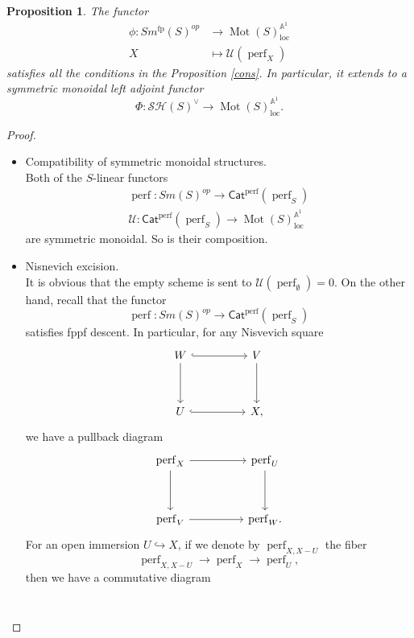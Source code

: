 \documentclass{article}
\newtheorem{prop}[thm]{Proposition}
\theoremstyle{definition}
\newcommand{\on}{\operatorname}
\begin{document}
\begin{prop}\label{ver.}
The functor\[
\begin{aligned}
\phi: Sm^{\on{fp}}(S)^{op} &\rightarrow \on{Mot}(S)_{\on{loc}}^{\mathbb{A}^1}\\
 X & \mapsto \mathcal{U}(\on{perf}_X)
 \end{aligned}\]
satisfies all the conditions in the Proposition \ref{cons}. In particular, it extends to a symmetric monoidal left adjoint functor \[ \Phi:\mathcal{SH}(S)^\vee \rightarrow \on{Mot}(S)_{\on{loc}}^{\mathbb{A}^1}.
\]
\end{prop}
\begin{proof}
\begin{itemize}
\item Compatibility of symmetric monoidal structures.\\
Both of the $S$-linear functors\[
\begin{gathered}
\on{perf}:Sm(S)^{op}\rightarrow \mathsf{Cat}^{\on{perf}}(\on{perf}_S)\\
\mathcal{U}:\mathsf{Cat}^{\on{perf}}(\on{perf}_S)\rightarrow\on{Mot}(S)_{\on{loc}}^{\mathbb{A}^1}
\end{gathered}
\]
are symmetric monoidal. So is their composition.
\item Nisnevich excision.\\
It is obvious that the empty scheme is sent to $\mathcal{U}(\on{perf}_{\emptyset})=0$. On the other hand, recall that the functor\[
\on{perf}:Sm(S)^{op}\rightarrow \mathsf{Cat}^{\on{perf}}(\on{perf}_S)\]
satisfies fppf descent. In particular, for any Nisvevich square
\[\begin{tikzcd}
	W && V \\
	\\
	U && X
	\arrow[hook, from=1-1, to=1-3]
	\arrow[from=1-1, to=3-1]
	\arrow[from=1-3, to=3-3]
	\arrow[hook, from=3-1, to=3-3],
\end{tikzcd}\]
we have a pullback diagram
\[\begin{tikzcd}
	{\on{perf}_X} && {\on{perf}_U} \\
	\\
	{\on{perf}_V} && {\on{perf}_W}
	\arrow[from=1-1, to=1-3]
	\arrow[from=1-1, to=3-1]
	\arrow[from=1-3, to=3-3]
	\arrow[from=3-1, to=3-3].
\end{tikzcd}\]
For an open immersion $U\hookrightarrow X$, if we denote by $\on{perf}_{X,X-U}$ the fiber\[
\on{perf}_{X,X-U}\rightarrow\on{perf}_X\rightarrow\on{perf}_U,\]
then we have a commutative diagram
\[\begin{tikzcd}

\end{tikzcd}\]
\end{itemize}
\end{proof}
\end{document}
